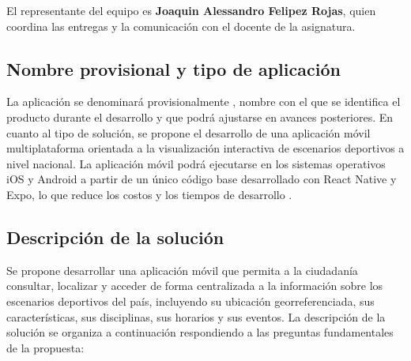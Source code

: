 El representante del equipo es \textbf{Joaquin Alessandro Felipez Rojas},
 quien coordina las entregas y la comunicaci\'on con el docente de la
asignatura.

\subsection{Nombre provisional y tipo de aplicaci\'on}

La aplicaci\'on se denominar\'a provisionalmente \nombreApp{}, nombre con el que
se identifica el producto durante el desarrollo y que podr\'a ajustarse en
avances posteriores. En cuanto al tipo de soluci\'on, se propone el desarrollo
de una aplicaci\'on m\'ovil multiplataforma orientada a la
visualizaci\'on interactiva de escenarios deportivos a nivel nacional. La
aplicaci\'on m\'ovil podr\'a ejecutarse en los sistemas operativos iOS y Android
a partir de un \'unico c\'odigo base desarrollado con React Native y Expo, lo
que reduce los costos y los tiempos de desarrollo \citep{pressman2010}.

\subsection{Descripci\'on de la soluci\'on}

Se propone desarrollar una aplicaci\'on m\'ovil que permita a
la ciudadan\'ia consultar, localizar y acceder de forma centralizada a la
informaci\'on sobre los escenarios deportivos del pa\'is, incluyendo su
ubicaci\'on georreferenciada, sus caracter\'isticas, sus disciplinas, sus
horarios y sus eventos. La descripci\'on de la soluci\'on se organiza a
continuaci\'on respondiendo a las preguntas fundamentales de la propuesta:

